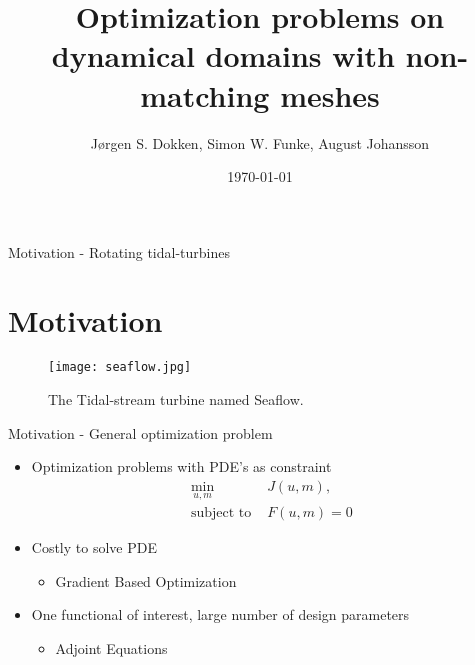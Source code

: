 \documentclass[mathserif]{beamer}
\title[NSCM29]{Optimization problems on dynamical domains with non-matching meshes}
\author{Jørgen S. Dokken, Simon W. Funke, August Johansson}
\institute{Simula Research Laboratory}
\date{\today}
\begin{document}
\simulatitlepage


\begin{frame}{Motivation - Rotating tidal-turbines\section{Motivation}}
  \begin{figure}
    \centering
    \texttt{[image: seaflow.jpg]}
    \caption{The Tidal-stream turbine named Seaflow.}
  \end{figure}
\end{frame}

\begin{frame}{Motivation -  General optimization problem}
  \begin{itemize}
  \item Optimization problems with PDE's as constraint
    \begin{align}
      \min_{u,m}\quad&J(u,m),\\
      \text{subject to  } & F(u,m)=0
    \end{align}
  \item Costly to solve PDE
    \begin{itemize}
    \item Gradient Based Optimization
    \end{itemize}
  \item One functional of interest, large number of design parameters
    \begin{itemize}
    \item Adjoint Equations
    \end{itemize}

  \end{itemize}

  
\end{frame}
\end{document}
